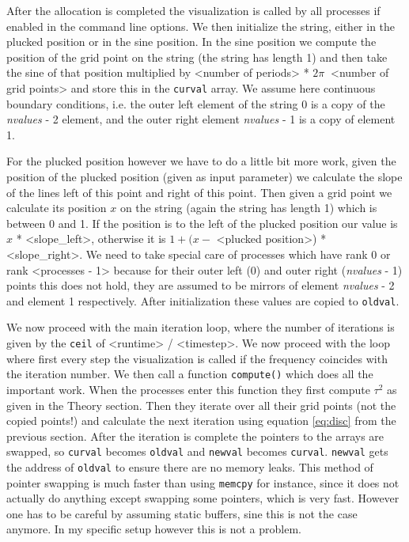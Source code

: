 \documentclass[11pt,a4paper,onecolumn]{article}
\begin{document}
After the allocation is completed the visualization is called by all processes if enabled in the command line options. We then initialize the string, either in the plucked position or in the sine position. In the sine position we compute the position of the grid point on the string (the string has length 1) and then take the sine of that position multiplied by <number of periods> * $2\pi \ $ <number of grid points> and store this in the \texttt{curval} array. We assume here continuous boundary conditions, i.e. the outer left element of the string 0 is a copy of the \emph{nvalues} - 2 element, and the outer right element \emph{nvalues} - 1 is a copy of element 1. 

For the plucked position however we have to do a little bit more work, given the position of the plucked position (given as input parameter) we calculate the slope of the lines left of this point and right of this point. Then given a grid point we calculate its position $x$ on the string (again the string has length 1) which is between 0 and 1. If the position is to the left of the plucked position our value is $x$ * <slope\_left>, otherwise it is $1 + (x - $ <plucked position>) * <slope\_right>. We need to take special care of processes which have rank 0 or rank <processes - 1> because for their outer left (0) and outer right (\emph{nvalues} - 1) points this does not hold, they are assumed to be mirrors of element \emph{nvalues} - 2 and element 1 respectively. After initialization these values are copied to \texttt{oldval}.

We now proceed with the main iteration loop, where the number of iterations is given by the \texttt{ceil} of <runtime> / <timestep>. We now proceed with the loop where first every step the visualization is called if the frequency coincides with the iteration number. We then call a function \texttt{compute()} which does all the important work. When the processes enter this function they first compute $\tau^2$ as given in the Theory section. Then they iterate over all their grid points (not the copied points!) and calculate the next iteration using equation \ref{eq:disc} from the previous section. After the iteration is complete the pointers to the arrays are swapped, so \texttt{curval} becomes \texttt{oldval} and \texttt{newval} becomes \texttt{curval}. \texttt{newval} gets the address of \texttt{oldval} to ensure there are no memory leaks. This method of pointer swapping is much faster than using \texttt{memcpy} for instance, since it does not actually do anything except swapping some pointers, which is very fast. However one has to be careful by assuming static buffers, sine this is not the case anymore. In my specific setup however this is not a problem. 
\end{document}
